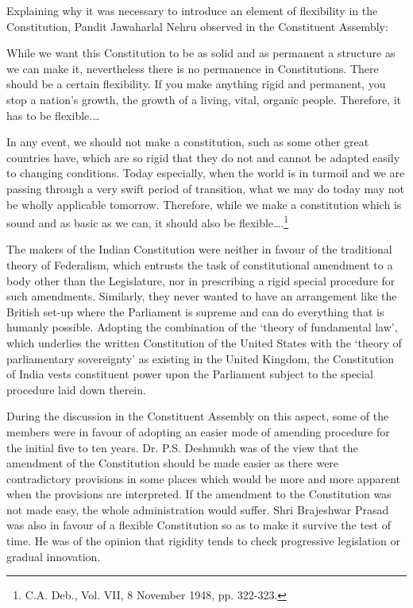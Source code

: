 \begin{multicols}{2}

\noi
Explaining why it was necessary to introduce an element of flexibility in the Constitution,
Pandit Jawaharlal Nehru observed in the Constituent Assembly:

\noi
While we want this Constitution to be as solid and as permanent a structure as we can make
it, nevertheless there is no permanence in Constitutions. There should be a certain flexibility.
If you make anything rigid and permanent, you stop a nation’s growth, the growth of a living,
vital, organic people. Therefore, it has to be flexible.…

\noi
In any event, we should not make a constitution, such as some other great countries have,
which are so rigid that they do not and cannot be adapted easily to changing conditions. Today
especially, when the world is in turmoil and we are passing through a very swift period of
transition, what we may do today may not be wholly applicable tomorrow. Therefore, while
we make a constitution which is sound and as basic as we can, it should also be flexible….\footnote{C.A. Deb., Vol. VII, 8 November 1948, pp. 322-323.}


\noi
The makers of the Indian Constitution were neither in favour of the traditional theory of
Federalism, which entrusts the task of constitutional amendment to a body other than the
Legislature, nor in prescribing a rigid special procedure for such amendments. Similarly, they
never wanted to have an arrangement like the British set-up where the Parliament is supreme
and can do everything that is humanly possible. Adopting the combination of the ‘theory of
fundamental law’, which underlies the written Constitution of the United States with the
‘theory of parliamentary sovereignty’ as existing in the United Kingdom, the Constitution of
India vests constituent power upon the Parliament subject to the special procedure laid down
therein.

\noi
During the discussion in the Constituent Assembly on this aspect, some of the members were
in favour of adopting an easier mode of amending procedure for the initial five to ten years.
Dr. P.S. Deshmukh was of the view that the amendment of the Constitution should be made
easier as there were contradictory provisions in some places which would be more and more
apparent when the provisions are interpreted. If the amendment to the Constitution was not
made easy, the whole administration would suffer. Shri Brajeshwar Prasad was also in favour of a flexible Constitution so as to make it survive the test of time. He was of the opinion that
rigidity tends to check progressive legislation or gradual innovation.


\end{multicols}
